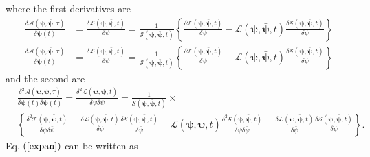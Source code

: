 \documentclass[aps,preprint]{revtex4}%
\begin{document}
where the first derivatives are
\begin{align}
\frac{\delta\mathcal{A}\left(  \mathbf{\psi},\mathbf{\bar{\psi},}\tau\right)
}{\delta\mathbf{\psi}\left(  t\right)  }  & =\frac{\delta\mathcal{L}\left(
\mathbf{\psi},\mathbf{\bar{\psi},}t\right)  }{\delta\psi}=\frac{1}%
{\mathcal{S}\left(  \mathbf{\psi},\mathbf{\bar{\psi},}t\right)  }\left\{
\frac{\delta\mathcal{T}\left(  \mathbf{\psi},\mathbf{\bar{\psi},}t\right)
}{\delta\psi}-\mathcal{L}\left(  \mathbf{\psi},\mathbf{\bar{\psi},}t\right)
\frac{\delta\mathcal{S}\left(  \mathbf{\psi},\mathbf{\bar{\psi},}t\right)
}{\delta\psi}\right\}  \\
\frac{\delta\mathcal{A}\left(  \mathbf{\psi},\mathbf{\bar{\psi},}\tau\right)
}{\delta\mathbf{\psi}\left(  t\right)  }  & =\frac{\delta\mathcal{L}\left(
\mathbf{\psi},\mathbf{\bar{\psi},}t\right)  }{\delta\psi}=\frac{1}%
{\mathcal{S}\left(  \mathbf{\psi},\mathbf{\bar{\psi},}t\right)  }\left\{
\frac{\delta\mathcal{T}\left(  \mathbf{\psi},\mathbf{\bar{\psi},}t\right)
}{\delta\psi}-\overline{\mathcal{L}\left(  \mathbf{\psi},\mathbf{\bar{\psi}%
,}t\right)  }\frac{\delta\mathcal{S}\left(  \mathbf{\psi},\mathbf{\bar{\psi}%
,}t\right)  }{\delta\psi}\right\}
\end{align}
and the second are
\begin{align}
& \frac{\delta^{2}\mathcal{A}\left(  \mathbf{\psi},\mathbf{\bar{\psi},}%
\tau\right)  }{\delta\mathbf{\psi}\left(  t\right)  \delta\mathbf{\bar{\psi}%
}\left(  t\right)  }=\frac{\delta^{2}\mathcal{L}\left(  \mathbf{\psi
},\mathbf{\bar{\psi},}t\right)  }{\delta\psi\delta\bar{\psi}}=\frac
{1}{\mathcal{S}\left(  \mathbf{\psi},\mathbf{\bar{\psi},}t\right)  }\times\\
& \left\{  \frac{\delta^{2}\mathcal{T}\left(  \mathbf{\psi},\mathbf{\bar{\psi
},}t\right)  }{\delta\psi\delta\bar{\psi}}-\frac{\delta\mathcal{L}\left(
\mathbf{\psi},\mathbf{\bar{\psi},}t\right)  }{\delta\psi}\frac{\delta
\mathcal{S}\left(  \mathbf{\psi},\mathbf{\bar{\psi},}t\right)  }{\delta
\bar{\psi}}-\mathcal{L}\left(  \mathbf{\psi},\mathbf{\bar{\psi},}t\right)
\frac{\delta^{2}\mathcal{S}\left(  \mathbf{\psi},\mathbf{\bar{\psi},}t\right)
}{\delta\psi\delta\bar{\psi}}-\frac{\delta\mathcal{L}\left(  \mathbf{\psi
},\mathbf{\bar{\psi},}t\right)  }{\delta\bar{\psi}}\frac{\delta\mathcal{S}%
\left(  \mathbf{\psi},\mathbf{\bar{\psi},}t\right)  }{\delta\psi}\right\}  .
\end{align}
Eq. $\left(  \ref{expan}\right)  $ can be written as
\end{document}
